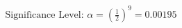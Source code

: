 \documentclass[preview]{standalone}
\begin{document}
\begin{align*}
\text{Significance Level: } \alpha = \left(\frac{1}{2}\right)^9 = 0.00195
\end{align*}
\end{document}
